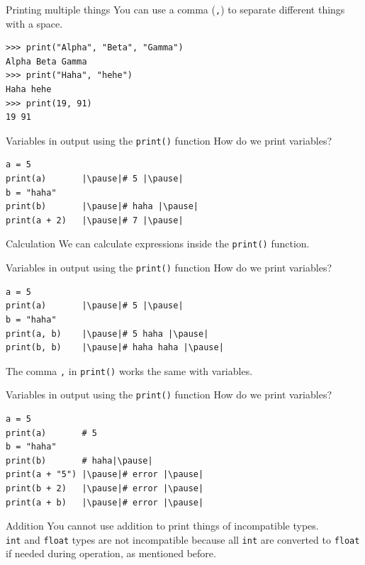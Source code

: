 \documentclass[dvipsnames, svgnames, x11names]{beamer}
\begin{document}
\begin{frame}[fragile]{Printing multiple things}
You can use a comma (\texttt{,}) to separate different things with a space.
\begin{verbatim} 
>>> print("Alpha", "Beta", "Gamma")
Alpha Beta Gamma
>>> print("Haha", "hehe")
Haha hehe
>>> print(19, 91)
19 91
\end{verbatim}
\end{frame}


\begin{frame}[fragile]{Variables in output using the \texttt{print()} function}
How do we print variables?

\begin{verbatim}
a = 5
print(a)       |\pause|# 5 |\pause|
b = "haha"
print(b)       |\pause|# haha |\pause|
print(a + 2)   |\pause|# 7 |\pause|
\end{verbatim}
\begin{block}{Calculation}
We can calculate expressions inside the \texttt{print()} function.
\end{block}
\end{frame}

\begin{frame}[fragile]{Variables in output using the \texttt{print()} function}
How do we print variables?

\begin{verbatim}
a = 5
print(a)       |\pause|# 5 |\pause|
b = "haha"
print(a, b)    |\pause|# 5 haha |\pause|
print(b, b)    |\pause|# haha haha |\pause|
\end{verbatim}
\begin{block}{The comma}
\texttt{,} in \texttt{print()} works the same with variables.
\end{block}
\end{frame}

\begin{frame}[fragile]{Variables in output using the \texttt{print()} function}
How do we print variables?

\begin{verbatim}
a = 5
print(a)       # 5
b = "haha"
print(b)       # haha|\pause|
print(a + "5") |\pause|# error |\pause|
print(b + 2)   |\pause|# error |\pause|
print(a + b)   |\pause|# error |\pause|
\end{verbatim}
\begin{block}{Addition}
You cannot use addition to print things of incompatible types.\\
\texttt{int} and \texttt{float} types are not incompatible because all \texttt{int} are converted to \texttt{float} if needed during operation, as mentioned before.
\end{block}
\end{frame}
\end{document}
